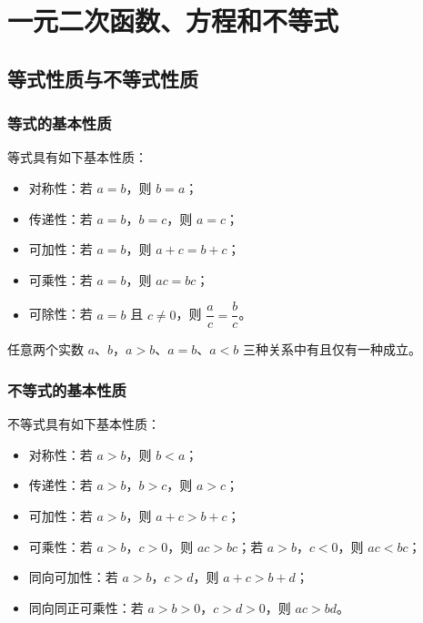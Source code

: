 \documentclass[lang=cn,newtx,10pt,scheme=chinese,nofont]{elegantbook}
\begin{document}
\chapter{一元二次函数、方程和不等式}

\section{等式性质与不等式性质}
\subsection{等式的基本性质}
\begin{definition}[等式的基本性质]
等式具有如下基本性质：
\begin{itemize}
    \item 对称性：若 $a=b$，则 $b=a$；
    \item 传递性：若 $a=b$，$b=c$，则 $a=c$；
    \item 可加性：若 $a=b$，则 $a+c=b+c$；
    \item 可乘性：若 $a=b$，则 $ac=bc$；
    \item 可除性：若 $a=b$ 且 $c \neq 0$，则 $\dfrac{a}{c}=\dfrac{b}{c}$。
\end{itemize}
\end{definition}
\begin{axiom}[实数的有序性]
任意两个实数 $a$、$b$，$a>b$、$a=b$、$a<b$ 三种关系中有且仅有一种成立。
\end{axiom}
\subsection{不等式的基本性质}
\begin{definition}[不等式的基本性质]
不等式具有如下基本性质：
\begin{itemize}
    \item 对称性：若 $a>b$，则 $b<a$；
    \item 传递性：若 $a>b$，$b>c$，则 $a>c$；
    \item 可加性：若 $a>b$，则 $a+c>b+c$；
    \item 可乘性：若 $a>b$，$c>0$，则 $ac>bc$；若 $a>b$，$c<0$，则 $ac<bc$；
    \item 同向可加性：若 $a>b$，$c>d$，则 $a+c>b+d$；
    \item 同向同正可乘性：若 $a>b>0$，$c>d>0$，则 $ac>bd$。
\end{itemize}
\end{definition}
\end{document}
